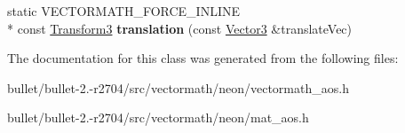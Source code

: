 \begin{DoxyCompactItemize}
\item 
\hypertarget{class_vectormath_1_1_aos_1_1_transform3_a01963970d9591b93326d61284a7b1f41}{static V\+E\+C\+T\+O\+R\+M\+A\+T\+H\+\_\+\+F\+O\+R\+C\+E\+\_\+\+I\+N\+L\+I\+N\+E \\*
const \hyperlink{class_vectormath_1_1_aos_1_1_transform3}{Transform3} {\bfseries translation} (const \hyperlink{class_vectormath_1_1_aos_1_1_vector3}{Vector3} \&translate\+Vec)}\label{class_vectormath_1_1_aos_1_1_transform3_a01963970d9591b93326d61284a7b1f41}

\end{DoxyCompactItemize}


The documentation for this class was generated from the following files\+:\begin{DoxyCompactItemize}
\item 
bullet/bullet-\/2.-\/r2704/src/vectormath/neon/vectormath\+\_\+aos.\+h\item 
bullet/bullet-\/2.-\/r2704/src/vectormath/neon/mat\+\_\+aos.\+h\end{DoxyCompactItemize}
